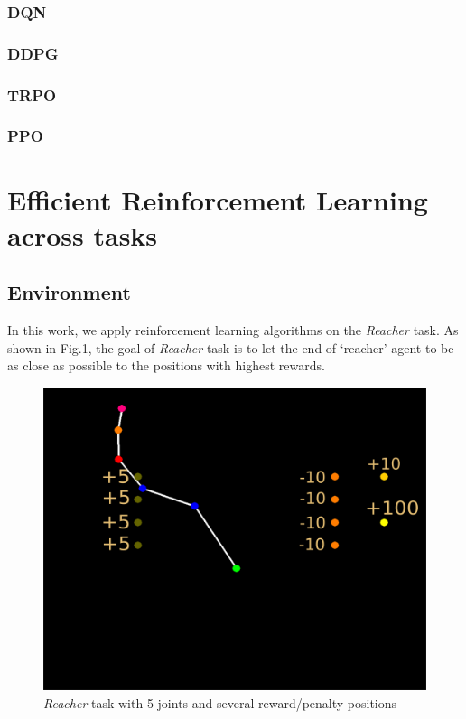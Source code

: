 \documentclass{article}
\begin{document}
\subsubsection{DQN}
\subsubsection{DDPG}
\subsubsection{TRPO}
\subsubsection{PPO}






\section{Efficient Reinforcement Learning across tasks}
\subsection{Environment}
In this work, we apply reinforcement learning algorithms on the \textit{Reacher} task. As shown in Fig.1, the goal of \textit{Reacher} task is to let the end of `reacher'  agent to be as close as possible to the positions with highest rewards.
\begin{figure}[htbp]
	\centering
	\includegraphics[scale=0.2]{img/reacher.png}
	\caption{\textit{Reacher} task with 5 joints and several reward/penalty positions}
	\label{fig:universe}
\end{figure}
\end{document}
